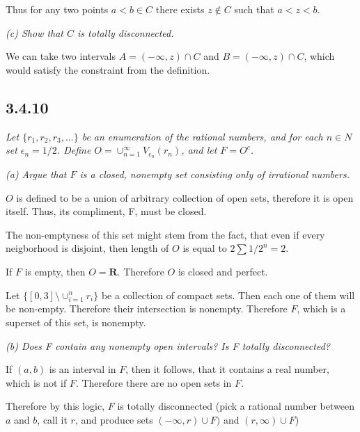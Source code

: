 \documentclass[11pt,oneside,titlepage]{book}
\begin{document}
Thus for any two points $a< b \in C$ there exists $z \notin C$ such that
$a < z < b$.

\textit{(c) Show that $C$ is totally disconnected.}

We can take two intervals $A = (-\infty, z) \cap C$ and
$B = (-\infty, z) \cap C$, which would satisfy the constraint from the
definition.

\subsection*{3.4.10}
\textit{Let $\{r_1, r_2, r_3, ... \}$ be an enumeration of the rational
  numbers, and for each $n \in N$ set $\epsilon_n = 1/2$. Define
  $O = \cup_{n = 1}^{\infty}V_{\epsilon_n}(r_n)$, and let $F = O^c$.}

\textit{(a) Argue that $F$ is a closed, nonempty set consisting only of irrational numbers.}

$O$ is defined to be a union of arbitrary collection of open sets, therefore
it is open itself. Thus, its compliment, F,  must be closed.

The non-emptyness of this set might stem from the fact, that even if
every neigborhood is disjoint, then  length of $O$ is
equal to $2 \sum 1/2^n = 2$.

If $F$ is empty, then $O = \textbf{R}$. Therefore $O$ is closed and perfect.

Let $\{[0, 3] \setminus \cup_{i = 1}^{n}r_i\}$ be a collection of compact sets.
Then each one of them will be non-empty. Therefore their intersection
is nonempty. Therefore $F$, which is a superset of this set,  is nonempty.




\textit{(b) Does F contain any nonempty open intervals? Is F totally
  disconnected? }

If $(a, b)$ is an interval in $F$, then it follows, that it contains a real
number, which is not if $F$. Therefore there are no open sets in $F$.

Therefore by this logic, $F$ is totally disconnected (pick a rational
number between $a$ and $b$, call it $r$, and produce
sets $(-\infty, r) \cup F)$ and $(r, \infty) \cup F$)
\end{document}

